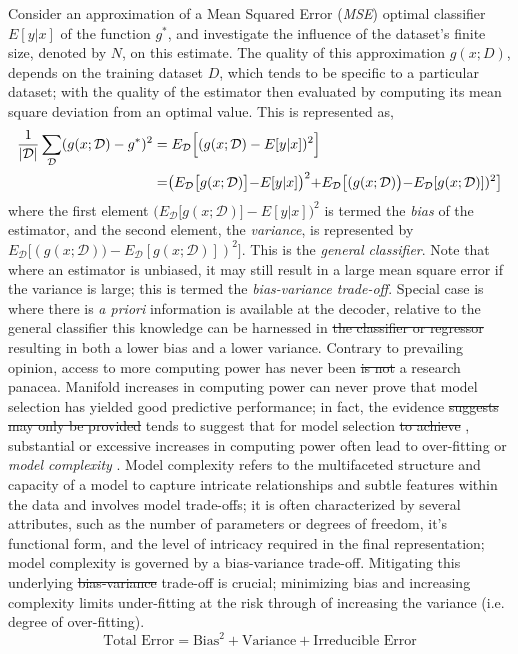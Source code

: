 \documentclass[10pt]{article}[draft]
\begin{document}
Consider an approximation of a Mean Squared Error (\emph{MSE}) optimal classifier \(E[y|x]\) of the function $g^*$, and investigate the influence of the dataset's finite size, denoted by \(N\), on this estimate. The quality of this approximation  \(g(x;D)\), depends on the training dataset \(D\), which tends to be specific to a particular dataset; with the quality of the estimator then evaluated by computing its mean square deviation from an optimal value. This is represented as, 
\begin{equation}
	\begin{split}
		\frac{1}{|\mathcal{D}|} \sum_{\mathcal{D}} (g(x;\mathcal{D}) - g^*)^2  & = E_{\mathcal{D}} \Bigl[ (g(x;\mathcal{D}) - E[y|x] )^2 \Bigl] \\
		& = \bigr( E_{\mathcal{D}} \bigl[ g(x;\mathcal{D}) \bigl] - E[y|x]  \bigl)^2  + E_{\mathcal{D}} \bigl[ (g(x;\mathcal{D}) \bigl) - E_{\mathcal{D} }[g(x;\mathcal{D})  ])^2 \bigr] \\
	\end{split}
\end{equation}
where the first element $\bigr( E_{\mathcal{D}} \bigl[ g(x;\mathcal{D}) \bigl] - E[y|x]  \bigl)^2 $ is  termed the \emph{bias} of the estimator, and the second element, the \emph{variance}, is represented by  $E_{\mathcal{D}} \bigl[ (g(x;\mathcal{D}) \bigl) - E_{\mathcal{D} }[g(x;\mathcal{D})  ])^2 \bigr]$. This is the \emph{general classifier}.	Note that where an estimator is unbiased, it may still result in a large mean square error if the variance is large; this is termed the \emph{bias-variance trade-off}.  Special case is where there is \emph{a priori} information is available at the decoder, relative to the {general classifier} this knowledge can be harnessed in \st{the classifier or regressor} resulting in both a lower bias and a lower variance.
Contrary to  prevailing opinion, access to more computing power has never been \st{is not} a research panacea. Manifold increases in computing power can never prove that model selection has yielded good predictive performance; in fact, the evidence \st{suggests may only be provided}  tends to suggest that for model selection \st{to achieve} , substantial or excessive increases in computing power often lead to over-fitting or \emph{model complexity} \cite{bengio2012practical, goodfellow2016, srivastava2014dropout, mukherjee2006learning}. Model complexity refers to the multifaceted structure and capacity of a model to capture intricate relationships and subtle features within the data and involves model trade-offs; it is often characterized by several attributes, such as the number of parameters or degrees of freedom, it's functional form, and the level of intricacy  required in the final representation; model complexity is governed by a {bias-variance trade-off}.  Mitigating this underlying \st{bias-variance} trade-off is crucial; minimizing bias and increasing complexity limits under-fitting at the risk through of increasing the variance (i.e. degree of over-fitting). 
  \begin{equation}
  	\text{Total Error} = \text{Bias}^2 + \text{Variance} +  \text{Irreducible Error}
  \end{equation}
\end{document}
